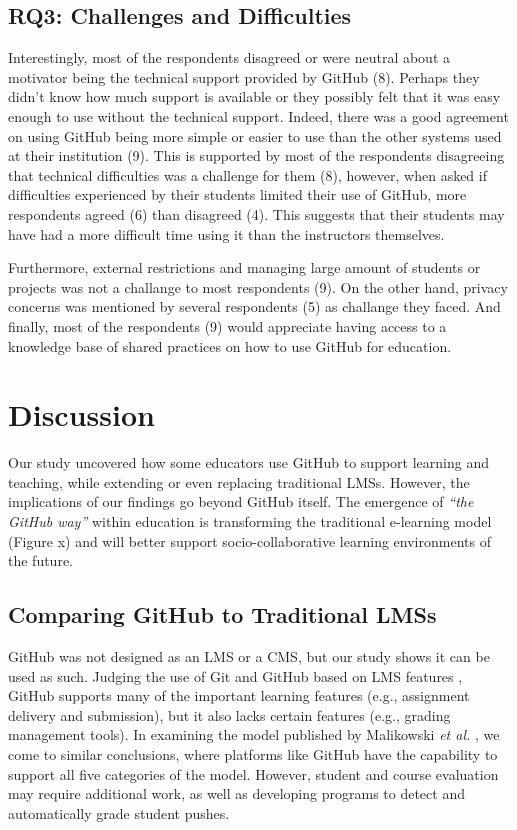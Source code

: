 \subsection{RQ3: Challenges and Difficulties}
Interestingly, most of the respondents disagreed or were neutral about a motivator being the technical support provided by GitHub (8). Perhaps they didn't know how much support is available or they possibly felt that it was easy enough to use without the technical support. Indeed, there was a good agreement on using GitHub being more simple or easier to use than the other systems used at their institution (9). This is supported by most of the respondents disagreeing that technical difficulties was a challenge for them (8), however, when asked if difficulties experienced by their students limited their use of GitHub, more respondents agreed (6) than disagreed (4). This suggests that their students may have had a more difficult time using it than the instructors themselves.

Furthermore, external restrictions and managing large amount of students or projects was not a challange to most respondents (9). On the other hand, privacy concerns was mentioned by several respondents (5) as challange they faced. And finally, most of the respondents (9) would appreciate having access to a knowledge base of shared practices on how to use GitHub for education.

\section{Discussion}
Our study uncovered how some educators use GitHub to support learning and teaching, while extending or even replacing traditional LMSs. However, the implications of our findings go beyond GitHub itself. The emergence of \textit{``the GitHub way''} within education is transforming the traditional e-learning model (Figure x) and will better support socio-collaborative learning environments \cite{kreijns2002sociability} of the future.

\subsection{Comparing GitHub to Traditional LMSs}
GitHub was not designed as an LMS or a CMS, but our study shows it can be used as such. Judging the use of Git and GitHub based on LMS features \cite{kumar2011comparative}, GitHub supports many of the important learning features (e.g., assignment delivery and submission), but it also lacks certain features (e.g., grading management tools). In examining the model published by Malikowski \textit{et al.} \cite{malikowski2007model}, we come to similar conclusions, where platforms like GitHub have the capability to support all five categories of the model. However, student and course evaluation may require additional work, as well as developing programs to detect and automatically grade student pushes.

